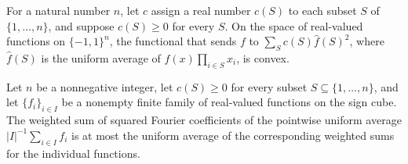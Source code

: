 \begin{theorem}
\label{FABL.convexOn_fourierSquareFunctional}
\leanok
{}
For a natural number $n$, let $c$ assign a real number $c(S)$ to each subset $S$ of
$\{1,\ldots,n\}$, and suppose $c(S)\ge 0$ for every $S$. On the space of real-valued
functions on $\{-1,1\}^n$, the functional that sends $f$ to $\sum_S c(S)\widehat
f(S)^2$, where $\widehat f(S)$ is the uniform average of $f(x)\prod_{i\in S}x_i$, is
convex.
\end{theorem}

\begin{theorem}
\label{FABL.fourierSquareFunctional_uniformExpectation_le}
\leanok
{}
Let $n$ be a nonnegative integer, let $c(S)\ge 0$ for every subset
$S\subseteq\{1,\ldots,n\}$, and let $\{f_i\}_{i\in I}$ be a nonempty finite family of
real-valued functions on the sign cube. The weighted sum of squared Fourier coefficients
of the pointwise uniform average $|I|^{-1}\sum_{i\in I} f_i$ is at most the uniform
average of the corresponding weighted sums for the individual functions.
\end{theorem}
